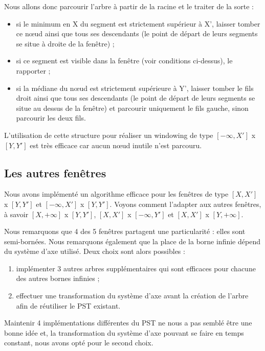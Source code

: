 \documentclass[10pt,a4paper]{article}
\begin{document}
Nous allons donc parcourir l'arbre à partir de la racine et le traiter de la sorte :
\begin{itemize}
	\item si le minimum en X du segment est strictement supérieur à X', laisser tomber ce nœud ainsi que tous ses descendants (le point de départ de leurs segments se situe à droite de la fenêtre) ;
	\item si ce segment est visible dans la fenêtre (voir conditions ci-dessus), le rapporter ;
	\item si la médiane du nœud est strictement supérieure à Y', laisser tomber le fils droit ainsi que tous ses descendants (le point de départ de leurs segments se situe au dessus de la fenêtre) et parcourir uniquement le fils gauche, sinon parcourir les deux fils.
\end{itemize}

L'utilisation de cette structure pour réaliser un windowing de type $[-\infty, X']$ x $[Y, Y']$ est très efficace car aucun nœud inutile n'est parcouru.


\subsection{Les autres fenêtres}
Nous avons implémenté un algorithme efficace pour les fenêtres de type $[X, X']$ x $[Y, Y']$ et $[-\infty, X']$ x $[Y, Y']$. Voyons comment l'adapter aux autres fenêtres, à savoir $[X, +\infty]$ x $[Y, Y']$, $[X, X']$ x $[-\infty, Y']$ et $[X, X']$ x $[Y, +\infty]$.

Nous remarquons que 4 des 5 fenêtres partagent une particularité :  elles sont semi-bornées. Nous remarquons également que la place de la borne infinie dépend du système d'axe utilisé. Deux choix sont alors possibles :
\begin{enumerate}
	\item implémenter 3 autres arbres supplémentaires qui sont efficaces pour chacune des autres bornes infinies ;
	\item effectuer une transformation du système d'axe avant la création de l'arbre afin de réutiliser le PST existant.
\end{enumerate}

Maintenir 4 implémentations différentes du PST ne nous a pas semblé être une bonne idée et, la transformation du système d'axe pouvant se faire en temps constant, nous avons opté pour le second choix.
\end{document}
